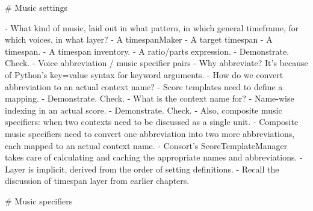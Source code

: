 \begin{markdown}
#   Music settings

-   What kind of music, laid out in what pattern, in which general
    timeframe, for which voices, in what layer?
-   A timespanMaker
-   A target timespan
    -   A timespan.
    -   A timespan inventory.
    -   A ratio/parts expression.
        -   Demonstrate. Check.
-   Voice abbreviation / music specifier pairs
    -   Why abbreviate? It's because of Python's key=value syntax for
        keyword arguments.
    -   How do we convert abbreviation to an actual context name?
        -   Score templates need to define a mapping.
        -   Demonstrate. Check.
    -   What is the context name for?
        -   Name-wise indexing in an actual score.
        -   Demonstrate. Check.
    -   Also, composite music specifiers: when two contexts need to be
        discussed as a single unit.
        -   Composite music specifiers need to convert one abbreviation into
            two more abbreviations, each mapped to an actual context name.
        -   Consort's ScoreTemplateManager takes care of calculating and
            caching the appropriate names and abbreviations.
-   Layer is implicit, derived from the order of setting definitions.
    -   Recall the discussion of timespan layer from earlier chapters.

# Music specifiers


\end{markdown}
